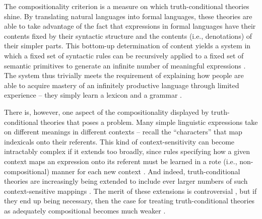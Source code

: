 The compositionality criterion is a measure on which truth-conditional theories shine. By translating natural languages into formal languages, these theories are able to take advantage of the fact that expressions in formal languages have their contents fixed by their syntactic structure and the contents (i.e., denotations) of their simpler parts. This bottom-up determination of content yields a system in which a fixed set of syntactic rules can be recursively applied to a fixed set of semantic primitives to generate an infinite number of meaningful expressions \citep{Szabo:2013}. The system thus trivially meets the requirement of explaining how people are able to acquire mastery of an infinitely productive language through limited experience -- they simply learn a lexicon and a grammar \citep{Pinker:1994}. 

There is, however, one aspect of the compositionality displayed by truth-conditional theories that poses a problem. Many simple linguistic expressions take on different meanings in different contexts -- recall the ``characters'' that map indexicals onto their referents. This kind of context-sensitivity can become intractably complex if it extends too broadly, since rules specifying how a given context maps an expression onto its referent must be learned in a rote (i.e., non-compositional) manner for each new context \citep{Unnsteinsson:2014}. And indeed, truth-conditional theories are increasingly being extended to include ever larger numbers of such context-sensitive mappings \citep{Recanati:2012,Unnsteinsson:2014}. The merit of these extensions is controversial \citep{CappelenLepore:2005}, but if they end up being necessary, then the case for treating truth-conditional theories as adequately compositional becomes much weaker \citep{Unnsteinsson:2014}. 

